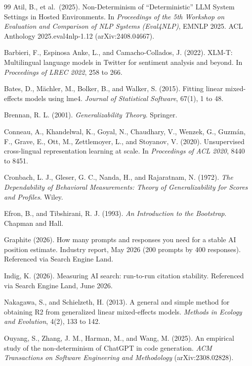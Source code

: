 \documentclass[pdflatex,sn-mathphys-num]{sn-jnl}
\begin{document}
\begin{thebibliography}{99}
 Atil, B., et al.~(2025). Non-Determinism of ``Deterministic'' LLM System Settings in Hosted Environments. In \emph{Proceedings of the 5th Workshop on Evaluation and Comparison of NLP Systems (Eval4NLP)}, EMNLP 2025. ACL Anthology 2025.eval4nlp-1.12 (arXiv:2408.04667).

 Barbieri, F., Espinosa Anke, L., and Camacho-Collados, J. (2022). XLM-T: Multilingual language models in Twitter for sentiment analysis and beyond. In \emph{Proceedings of LREC 2022}, 258 to 266.

 Bates, D., Mächler, M., Bolker, B., and Walker, S. (2015). Fitting linear mixed-effects models using lme4. \emph{Journal of Statistical Software}, 67(1), 1 to 48.

 Brennan, R. L. (2001). \emph{Generalizability Theory}. Springer.

 Conneau, A., Khandelwal, K., Goyal, N., Chaudhary, V., Wenzek, G., Guzmán, F., Grave, E., Ott, M., Zettlemoyer, L., and Stoyanov, V. (2020). Unsupervised cross-lingual representation learning at scale. In \emph{Proceedings of ACL 2020}, 8440 to 8451.

 Cronbach, L. J., Gleser, G. C., Nanda, H., and Rajaratnam, N. (1972). \emph{The Dependability of Behavioral Measurements: Theory of Generalizability for Scores and Profiles}. Wiley.

 Efron, B., and Tibshirani, R. J. (1993). \emph{An Introduction to the Bootstrap}. Chapman and Hall.

 Graphite (2026). How many prompts and responses you need for a stable AI position estimate. Industry report, May 2026 (200 prompts by 400 responses). Referenced via Search Engine Land.

 Indig, K. (2026). Measuring AI search: run-to-run citation stability. Referenced via Search Engine Land, June 2026.

 Nakagawa, S., and Schielzeth, H. (2013). A general and simple method for obtaining R2 from generalized linear mixed-effects models. \emph{Methods in Ecology and Evolution}, 4(2), 133 to 142.

 Ouyang, S., Zhang, J. M., Harman, M., and Wang, M. (2025). An empirical study of the non-determinism of ChatGPT in code generation. \emph{ACM Transactions on Software Engineering and Methodology} (arXiv:2308.02828).


\end{thebibliography}
\end{document}
